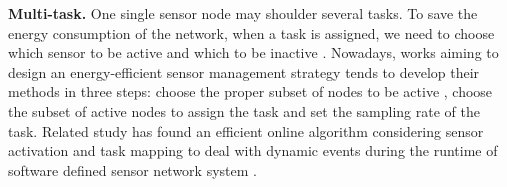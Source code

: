\textbf{Multi-task.}
One single sensor node may shoulder several tasks. To save the energy consumption of the network, 
when a task is assigned, we need to choose which sensor to be active and which to be inactive \cite{Georges2011Energy}. 
Nowadays, works aiming to design an energy-efficient sensor management strategy
tends to develop their methods in three steps: choose the proper subset of nodes to be active \cite{Aghdasi2009High}, choose the subset of active nodes to assign the task and set the sampling rate of the task. Related study has found an efficient online 
algorithm considering sensor activation and task mapping to deal with dynamic events during the 
runtime of software defined sensor network system \cite{Zeng2015}.
